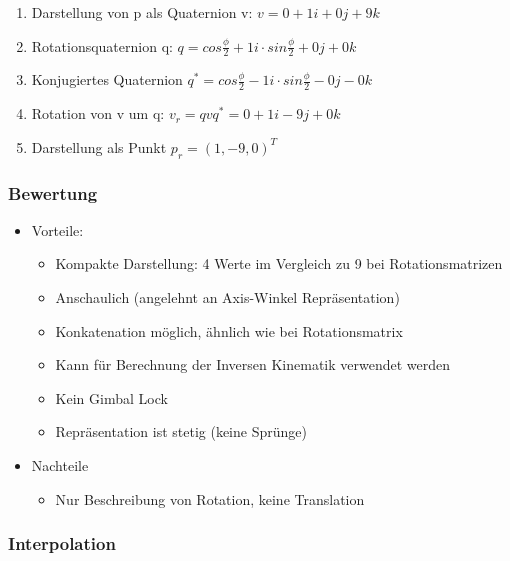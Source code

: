 \documentclass[paper=a4, fontsize=11pt]{scrartcl} %
\numberwithin{equation}{section} %
\numberwithin{figure}{section} %
\numberwithin{table}{section} %
\begin{document}
\begin{itemize}
\begin{enumerate}
\item Darstellung von p als Quaternion v: $v = 0 + 1i + 0j + 9k$
\item Rotationsquaternion q: $q = cos \frac{\phi}{2} + 1i \cdot sin \frac{\phi}{2} + 0j + 0k$
\item Konjugiertes Quaternion $q^* = cos \frac{\phi}{2} - 1i \cdot sin \frac{\phi}{2} - 0j - 0k$
\item Rotation von v um q: $v_r = qvq^* = 0 + 1i - 9j + 0k$
\item Darstellung als Punkt $p_r = (1,-9,0)^T$
\end{enumerate}

\subsubsection{Bewertung}

\begin{itemize}
\item Vorteile:
\begin{itemize}
\item Kompakte Darstellung: 4 Werte im Vergleich zu 9 bei Rotationsmatrizen
\item Anschaulich (angelehnt an Axis-Winkel Repräsentation)
\item Konkatenation möglich, ähnlich wie bei Rotationsmatrix
\item Kann für Berechnung der Inversen Kinematik verwendet werden
\item Kein Gimbal Lock
\item Repräsentation ist stetig (keine Sprünge)
\end{itemize}
\item Nachteile
\begin{itemize}
\item Nur Beschreibung von Rotation, keine Translation
\end{itemize}
\end{itemize}

\subsubsection{Interpolation}


\end{itemize}
\end{document}
